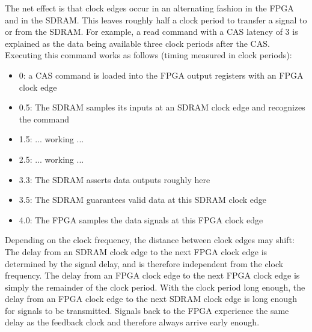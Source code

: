 The net effect is that clock edges occur in an alternating fashion in the FPGA and in the SDRAM. This leaves roughly half a clock period to transfer a signal to or from the SDRAM. For example, a read command with a CAS latency of 3 is explained as the data being available three clock periods after the CAS. Executing this command works as follows (timing measured in clock periods):
\begin{itemize}
\item 0: a CAS command is loaded into the FPGA output registers with an FPGA clock edge
\item 0.5: The SDRAM samples its inputs at an SDRAM clock edge and recognizes the command
\item 1.5: ... working ...
\item 2.5: ... working ...
\item 3.3: The SDRAM asserts data outputs roughly here
\item 3.5: The SDRAM guarantees valid data at this SDRAM clock edge
\item 4.0: The FPGA samples the data signals at this FPGA clock edge
\end{itemize}

Depending on the clock frequency, the distance between clock edges may shift: The delay from an SDRAM clock edge to the next FPGA clock edge is determined by the signal delay, and is therefore independent from the clock frequency. The delay from an FPGA clock edge to the next FPGA clock edge is simply the remainder of the clock period. With the clock period long enough, the delay from an FPGA clock edge to the next SDRAM clock edge is long enough for signals to be transmitted. Signals back to the FPGA experience the same delay as the feedback clock and therefore always arrive early enough.
